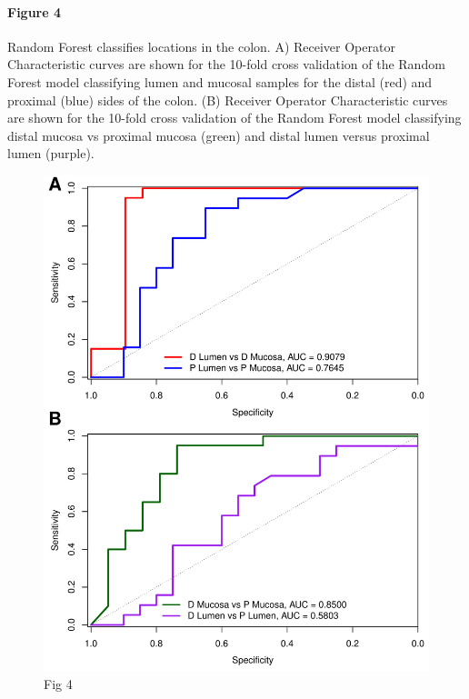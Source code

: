 \documentclass[12pt,]{article}
\let\oldparagraph\paragraph
\renewcommand{\paragraph}[1]{\oldparagraph{#1}\mbox{}}
\begin{document}
\newpage

\paragraph{Figure 4}\label{figure-4}

Random Forest classifies locations in the colon. A) Receiver Operator
Characteristic curves are shown for the 10-fold cross validation of the
Random Forest model classifying lumen and mucosal samples for the distal
(red) and proximal (blue) sides of the colon. (B) Receiver Operator
Characteristic curves are shown for the 10-fold cross validation of the
Random Forest model classifying distal mucosa vs proximal mucosa (green)
and distal lumen versus proximal lumen (purple).

\begin{figure}[htbp]
\centering
\includegraphics{../submission/figure_4.pdf}
\caption{Fig 4}
\end{figure}

\newpage
\end{document}
